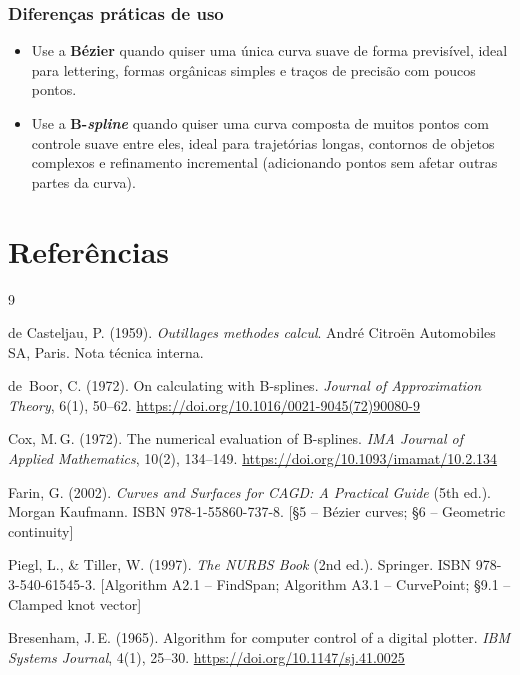 \documentclass[12pt, a4paper]{article}
\theoremstyle{remark}
\begin{document}
\subsubsection*{Diferenças práticas de uso}

\begin{itemize}
    \item Use a \textbf{Bézier} quando quiser uma única curva suave de forma
          previsível, ideal para lettering, formas orgânicas simples e
          traços de precisão com poucos pontos.
    \item Use a \textbf{B-\emph{spline}} quando quiser uma curva composta de
          muitos pontos com controle suave entre eles, ideal para trajetórias
          longas, contornos de objetos complexos e refinamento incremental
          (adicionando pontos sem afetar outras partes da curva).
\end{itemize}

\section{Referências}

\begin{thebibliography}{9}

de Casteljau, P. (1959).
\textit{Outillages methodes calcul}.
André Citroën Automobiles SA, Paris.
Nota técnica interna.

de~Boor, C. (1972).
On calculating with B-splines.
\textit{Journal of Approximation Theory}, 6(1), 50--62.
\url{https://doi.org/10.1016/0021-9045(72)90080-9}

Cox, M.\,G. (1972).
The numerical evaluation of B-splines.
\textit{IMA Journal of Applied Mathematics}, 10(2), 134--149.
\url{https://doi.org/10.1093/imamat/10.2.134}

Farin, G. (2002).
\textit{Curves and Surfaces for CAGD: A Practical Guide} (5th ed.).
Morgan Kaufmann.
ISBN 978-1-55860-737-8.
[§5 -- Bézier curves; §6 -- Geometric continuity]

Piegl, L., \& Tiller, W. (1997).
\textit{The NURBS Book} (2nd ed.).
Springer.
ISBN 978-3-540-61545-3.
[Algorithm A2.1 -- FindSpan; Algorithm A3.1 -- CurvePoint;
 §9.1 -- Clamped knot vector]

Bresenham, J.\,E. (1965).
Algorithm for computer control of a digital plotter.
\textit{IBM Systems Journal}, 4(1), 25--30.
\url{https://doi.org/10.1147/sj.41.0025}

\end{thebibliography}
\end{document}

